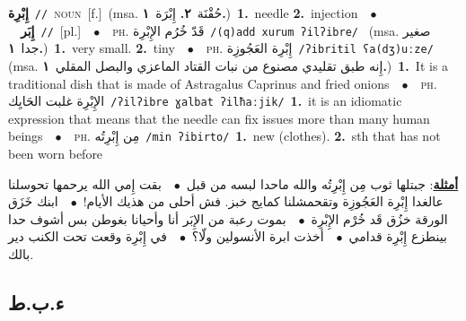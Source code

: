 \documentclass[10pt,a4paper,twoside]{article} %
\begin{document}
\begin{multicols}{2}
{{\setlength\topsep{0pt}\textbf{\foreignlanguage{arabic}{إِبْرِة}}\ {\color{gray}\texttt{//}\color{black}}\ \textsc{noun}\ [f.]\ \color{gray}(msa. \foreignlanguage{arabic}{حُقْنَة}~\foreignlanguage{arabic}{\textbf{٢.}}  \foreignlanguage{arabic}{إِبْرَة}~\foreignlanguage{arabic}{\textbf{١.}})\color{black}\ \textbf{1.}~needle  \textbf{2.}~injection\ \ $\bullet$\ \ \setlength\topsep{0pt}\textbf{\foreignlanguage{arabic}{إِبَر}}\ {\color{gray}\texttt{//}\color{black}}\ [pl.]\ \ $\bullet$\ \ \textsc{ph.} \color{gray} \foreignlanguage{arabic}{قَدّ خُرُم الإِبْرِة}\color{black}\ {\color{gray}\texttt{/{\sffamily (q)add xurum ʔilʔibre}/}\color{black}}\ \color{gray} (msa. \foreignlanguage{arabic}{صغير جدا}~\foreignlanguage{arabic}{\textbf{١.}})\color{black}\ \textbf{1.}~very small.  \textbf{2.}~tiny\ \ $\bullet$\ \ \textsc{ph.} \color{gray} \foreignlanguage{arabic}{إِبْرِة العَجُوزِة}\color{black}\ {\color{gray}\texttt{/{\sffamily ʔibritil ʕa(dʒ)uːze}/}\color{black}}\ \color{gray} (msa. \foreignlanguage{arabic}{إِنه طبق تقليدي مصنوع من نبات القتاد الماعزي والبصل المقلي}~\foreignlanguage{arabic}{\textbf{١.}})\color{black}\ \textbf{1.}~It is a traditional dish that is made of Astragalus Caprinus and fried onions\ \ $\bullet$\ \ \textsc{ph.} \color{gray} \foreignlanguage{arabic}{الإِبْرِة غلبت الحَايِك}\color{black}\ {\color{gray}\texttt{/{\sffamily ʔilʔibre ɣalbat ʔilħaːjik}/}\color{black}}\ \textbf{1.}~it is an idiomatic expression that means that the needle can fix issues more than many human beings\ \ $\bullet$\ \ \textsc{ph.} \color{gray} \foreignlanguage{arabic}{مِن إِبْرِتُه}\color{black}\ {\color{gray}\texttt{/{\sffamily min ʔibirto}/}\color{black}}\ \textbf{1.}~new (clothes).  \textbf{2.}~sth that has not been worn before\  \begin{flushright}\color{gray}\foreignlanguage{arabic}{\textbf{\underline{\foreignlanguage{arabic}{أمثلة}}}: جبتلها ثوب مِن إِبْرِتُه والله ماحدا لبسه من قبل\ $\bullet$\ \  بقت إِمي الله يرحمها تحوسلنا عالغدا إِبْرِة العَجُوزِة وتقحمشلنا كمايج خبز. فش أحلى من هذيك الأيام!\ $\bullet$\ \  ابنك خَزَق الورقة خزُق قَد خُرْم الإِبْرِة\ $\bullet$\ \  بموت رعبة من الإِبَر أنا وأحيانا بغوطن بس أشوف حدا بينطزع إِبْرِة قدامي\ $\bullet$\ \  أخذت ابرة الأنسولين ولّا؟\ $\bullet$\ \  في إِبْرِة وقعت تحت الكنب دير بالك.}\end{flushright}\color{black}} \vspace{2mm}

\vspace{-3mm}
\subsection*{\color{blue}\foreignlanguage{arabic}{ء.ب.ط}\color{blue}{}} 

}
\end{multicols}
\end{document}
